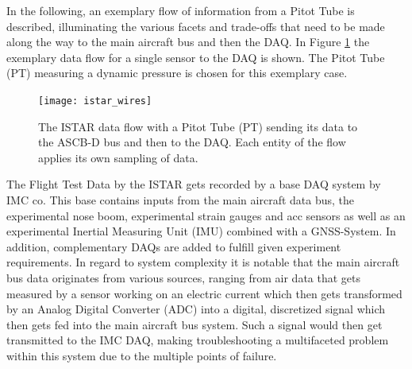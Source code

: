 In the following, an exemplary flow of information from a Pitot Tube is described, illuminating the various facets and trade-offs that need to be made along the way to the main aircraft bus and then the DAQ. In Figure \ref{fig:istar_wires} the exemplary data flow for a single sensor to the DAQ is shown. The Pitot Tube (PT) measuring a dynamic pressure is chosen for this exemplary case.
\begin{figure}[h]
    \centering
    \texttt{[image: istar\_wires]}
    \caption[The ISTAR crosssection displaying sensor information flow]{The ISTAR data flow with a Pitot Tube (PT) sending its data to the ASCB-D bus and then to the DAQ. Each entity of the flow applies its own sampling of data.}
    \label{fig:istar_wires}
\end{figure}


The Flight Test Data by the ISTAR gets recorded by a base DAQ system by IMC co. This base contains inputs from the main aircraft data bus, the experimental nose boom, experimental strain gauges and acc sensors as well as an experimental Inertial Measuring Unit (IMU) combined with a GNSS-System. In addition, complementary DAQs are added to fulfill given experiment requirements. In regard to system complexity it is notable that the main aircraft bus data originates from various sources, ranging from air data that gets measured by a sensor working on an electric current which then gets transformed by an Analog Digital Converter (ADC) into a digital, discretized signal which then gets fed into the main aircraft bus system. Such a signal would then get transmitted to the IMC DAQ, making troubleshooting a multifaceted problem within this system due to the multiple points of failure.

